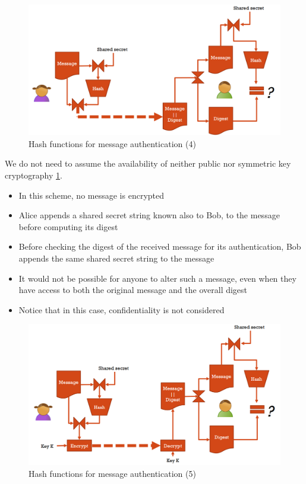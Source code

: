 \begin{figure}
	\centering
	\includegraphics[width=0.7\linewidth]{Images/Chapter6/hash_authentication4}
	\caption{Hash functions for message authentication (4)}
	\label{fig:hashauthentication4}
\end{figure}

We do not need to assume the availability of neither public nor symmetric key cryptography \ref{fig:hashauthentication4}.
\begin{itemize}
	\item In this scheme, no message is encrypted
	\item Alice appends a shared secret string known also to Bob, to the message before computing its digest
	\item Before checking the digest of the received message for its authentication, Bob appends the same shared secret string to the message
	\item It would not be possible for anyone to alter such a message, even when they have access to both the original message and the overall digest
	\item Notice that in this case, confidentiality is not considered
\end{itemize}

\begin{figure}
	\centering
	\includegraphics[width=0.7\linewidth]{Images/Chapter6/hash_authentication5}
	\caption{Hash functions for message authentication (5)}
	\label{fig:hashauthentication5}
\end{figure}

